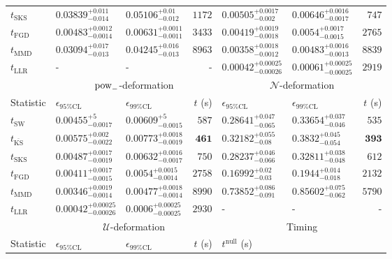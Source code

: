 \begin{tabular}{l|llr|llr}
	$t_{\mathrm{SKS}}$ & $0.03839_{-0.014}^{+0.011}$ & $0.05106_{-0.012}^{+0.01}$ & $1172$ & $0.00505_{-0.002}^{+0.0017}$ & $0.00646_{-0.0017}^{+0.0016}$ & $747$ \\
	$t_{\mathrm{FGD}}$ & ${\mathbf{0.00483_{-0.0014}^{+0.0012}}}$ & ${\mathbf{0.00631_{-0.0011}^{+0.0011}}}$ & $3433$ & $0.00419_{-0.0018}^{+0.0019}$ & $0.0054_{-0.0015}^{+0.0017}$ & $2765$ \\
	$t_{\mathrm{MMD}}$ & $0.03094_{-0.013}^{+0.017}$ & $0.04245_{-0.013}^{+0.016}$ & $8963$ & ${\mathbf{0.00358_{-0.0012}^{+0.0018}}}$ & ${\mathbf{0.00483_{-0.0013}^{+0.0016}}}$ & $8839$ \\
	$t_{\mathrm{LLR}}$ & - & - & - & $0.00042_{-0.00026}^{+0.00025}$ & $0.00061_{-0.00025}^{+0.00025}$ & $2919$ \\
	\toprule
	\multicolumn{1}{c}{} & \multicolumn{3}{c}{$\rm{pow}_{-}$-deformation} & \multicolumn{3}{c}{$\mathcal{N}$-deformation} \\
	Statistic & $\epsilon_{95\%\mathrm{CL}}$ & $\epsilon_{99\%\mathrm{CL}}$ & $t$ (s) & $\epsilon_{95\%\mathrm{CL}}$ & $\epsilon_{99\%\mathrm{CL}}$ & $t$ (s) \\
	\midrule
	$t_{\mathrm{SW}}$ & $0.00455_{-0.0017}^{+5}$ & $0.00609_{-0.0015}^{+5}$ & $587$ & $0.28641_{-0.065}^{+0.047}$ & $0.33654_{-0.046}^{+0.037}$ & $535$ \\
	$t_{\overline{\mathrm{KS}}}$ & $0.00575_{-0.0022}^{+0.002}$ & $0.00773_{-0.0019}^{+0.0018}$ & ${\mathbf{461}}$ & $0.32182_{-0.08}^{+0.055}$ & $0.3832_{-0.054}^{+0.045}$ & ${\mathbf{393}}$ \\
	$t_{\mathrm{SKS}}$ & $0.00487_{-0.0019}^{+0.0017}$ & $0.00632_{-0.0017}^{+0.0016}$ & $750$ & $0.28237_{-0.066}^{+0.046}$ & $0.32811_{-0.048}^{+0.038}$ & $612$ \\
	$t_{\mathrm{FGD}}$ & $0.00411_{-0.0015}^{+0.0017}$ & $0.0054_{-0.0014}^{+0.0015}$ & $2758$ & ${\mathbf{0.16992_{-0.03}^{+0.02}}}$ & ${\mathbf{0.1944_{-0.018}^{+0.014}}}$ & $2132$ \\
	$t_{\mathrm{MMD}}$ & ${\mathbf{0.00346_{-0.0014}^{+0.0019}}}$ & ${\mathbf{0.00477_{-0.0014}^{+0.0018}}}$ & $8990$ & $0.73852_{-0.091}^{+0.086}$ & $0.85602_{-0.062}^{+0.075}$ & $5790$ \\
	$t_{\mathrm{LLR}}$ & $0.00042_{-0.00026}^{+0.00025}$ & $0.0006_{-0.00025}^{+0.00025}$ & $2930$ & - & - & - \\
	\toprule
	\multicolumn{1}{c}{} & \multicolumn{3}{c}{$\mathcal{U}$-deformation} & \multicolumn{3}{c}{Timing} \\
	Statistic & $\epsilon_{95\%\mathrm{CL}}$ & $\epsilon_{99\%\mathrm{CL}}$ & $t$ (s) & $t^{\mathrm{null}}$ (s) \\

\end{tabular}
